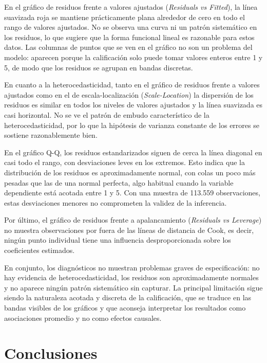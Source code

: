 \documentclass[11pt]{article}
\begin{document}
En el gráfico de residuos frente a valores ajustados (\textit{Residuals vs
Fitted}), la línea suavizada roja se mantiene prácticamente plana alrededor de
cero en todo el rango de valores ajustados. No se observa una curva ni un
patrón sistemático en los residuos, lo que sugiere que la forma funcional
lineal es razonable para estos datos. Las columnas de puntos que se ven en el
gráfico no son un problema del modelo: aparecen porque la calificación solo
puede tomar valores enteros entre 1 y 5, de modo que los residuos se agrupan
en bandas discretas.

En cuanto a la heterocedasticidad, tanto en el gráfico de residuos frente a
valores ajustados como en el de escala-localización (\textit{Scale-Location})
la dispersión de los residuos es similar en todos los niveles de valores
ajustados y la línea suavizada es casi horizontal. No se ve el patrón de
embudo característico de la heterocedasticidad, por lo que la hipótesis de
varianza constante de los errores se sostiene razonablemente bien.

En el gráfico Q-Q, los residuos estandarizados siguen de cerca la línea
diagonal en casi todo el rango, con desviaciones leves en los extremos. Esto
indica que la distribución de los residuos es aproximadamente normal, con
colas un poco más pesadas que las de una normal perfecta, algo habitual cuando
la variable dependiente está acotada entre 1 y 5. Con una muestra de 113.559
observaciones, estas desviaciones menores no comprometen la validez de la
inferencia.

Por último, el gráfico de residuos frente a apalancamiento (\textit{Residuals
vs Leverage}) no muestra observaciones por fuera de las líneas de distancia de
Cook, es decir, ningún punto individual tiene una influencia desproporcionada
sobre los coeficientes estimados.

En conjunto, los diagnósticos no muestran problemas graves de especificación:
no hay evidencia de heterocedasticidad, los residuos son aproximadamente
normales y no aparece ningún patrón sistemático sin capturar. La principal
limitación sigue siendo la naturaleza acotada y discreta de la calificación,
que se traduce en las bandas visibles de los gráficos y que aconseja
interpretar los resultados como asociaciones promedio y no como efectos
causales.

\section{Conclusiones}
\end{document}
